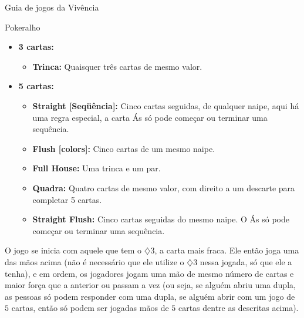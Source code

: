 \begin{secao}{Guia de jogos da Vivência }
\begin{subsecao}{Pokeralho}
\begin{itemize}
\begin{itemize}
\item \textbf{Par:} Quaisquer duas cartas de mesmo valor.
\end{itemize}
\item \textbf {3 cartas:}

\begin{itemize}
\item \textbf{Trinca:} Quaisquer três cartas de mesmo valor.
\end{itemize}
\item \textbf {5 cartas:}

\begin{itemize}
\item \textbf{Straight [Seqüência]:} Cinco cartas seguidas, de qualquer naipe, aqui há uma regra especial, a carta Ás só pode começar ou terminar uma sequência.
\item \textbf{Flush [colors]:} Cinco cartas de um mesmo naipe.
\item \textbf{Full House:} Uma trinca e um par.
\item \textbf{Quadra:} Quatro cartas de mesmo valor, com direito a um descarte para completar 5 cartas.
\item \textbf{Straight Flush:} Cinco cartas seguidas do mesmo naipe. O Ás só pode começar ou terminar uma sequência. 
\end{itemize}

\end{itemize}


O jogo se inicia com aquele 
que tem o $\diamondsuit$3, a carta mais fraca. Ele então joga uma das mãos acima (não é necessário que ele utilize o $\diamondsuit$3 nessa jogada, só que ele a tenha), e em ordem, os jogadores jogam uma mão de mesmo número de cartas e maior força que a anterior ou passam a vez (ou seja, se alguém abriu uma dupla, as pessoas só podem responder com uma dupla, se alguém abrir com um jogo de $5$ cartas, então só podem ser jogadas mãos de $5$ cartas dentre as descritas acima). 


\end{subsecao}
\end{secao}
